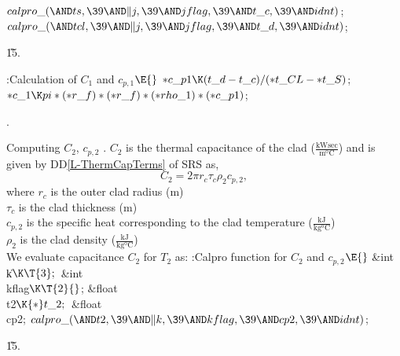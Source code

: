 \documentclass[letterpaper,12pt,baseclass=report]{cweb-hy}
\begin{document}
{${}\\{calpro\_}({\AND}\\{ts},\39{\AND}\|j,\39{\AND}\\{jflag},\39{\AND}\\{t\_c},%
\39{\AND}\\{idnt}){}$;\6
${}\\{calpro\_}({\AND}\\{tcl},\39{\AND}\|j,\39{\AND}\\{jflag},\39{\AND}\\{t%
\_d},\39{\AND}\\{idnt}){}$;\par
\U15.\fi

\Y\B\4:Calculation of $C_{1}$ and $c_{p,1}$\X${}\E{}$\6
${*}\\{c\_p1}\K(\\{t\_d}-\\{t\_c})/({*}\\{t\_CL}-{*}\\{t\_S}){}$;\6
${}{*}\\{c\_1}\K\\{pi}*({*}\\{r\_f})*({*}\\{r\_f})*({*}\\{rho\_1})*({*}\\{c%
\_p1}){}$;\par
{}.\fi

\fi

Computing $C_2$, ${c_{p,2}}$ .\label{c2cp2}
$C_2$ is the thermal capacitance of the clad ($\mathrm{\frac{kW sec}{m^oC}}$)
and is given by DD\ref{L-ThermCapTerms} of SRS as,
\begin{equation}
C_2 =2 \pi r_c \tau_c \rho_2 c_{p,2}, \label{eq:C_2}
\end{equation}
where
$r_c$ is the outer clad radius ($\text{m}$)\\
$\tau_c$ is the clad thickness ($\text{m}$)\\
$c_{p,2}$ is the specific heat corresponding to the  clad  temperature
($\mathrm{\frac{kJ}{kg^oC}}$)\\
$\rho_2$ is the  clad density ($\mathrm{\frac{kJ}{kg^oC}}$)\\
We evaluate capacitance $C_2$ for $T_2$ as:
\Y\B\4:Calpro function for $C_{2}$ and $c_{p,2}$\X${}\E{}$\6
\&{int} \|k${}\K\T{3};{}$\6
\&{int} \\{kflag}${}\K\T{2}{}$;\6
\&{float} \\{t2}${}\K{*}\\{t\_2};{}$\6
\&{float} \\{cp2};\7
${}\\{calpro\_}({\AND}\\{t2},\39{\AND}\|k,\39{\AND}\\{kflag},\39{\AND}\\{cp2},%
\39{\AND}\\{idnt}){}$;\par
\U15.\fi

}
\end{document}
